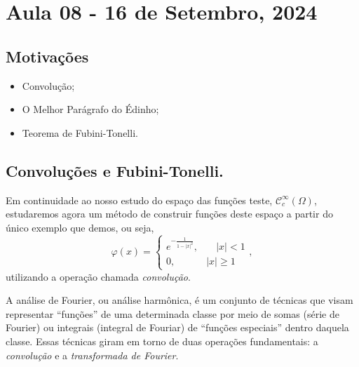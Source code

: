 \documentclass[../distribution_theory_notes.tex]{subfiles}
\begin{document}
\section{Aula 08 - 16 de Setembro, 2024}
\subsection{Motivações}
\begin{itemize}
	\item Convolução;
	\item O Melhor Parágrafo do Édinho;
	\item Teorema de Fubini-Tonelli.
\end{itemize}
\subsection{Convoluções e Fubini-Tonelli.}
Em continuidade ao nosso estudo do espaço das funções teste, \(\mathcal{C}_{c}^{\infty}(\Omega )\), estudaremos agora um método de construir funções deste espaço a partir do único exemplo que demos, ou seja,
\[
	\varphi (x) = \left\{\begin{array}{ll}
		e^{-\frac{1}{1-|x|^{2}}}, & \quad |x|<1 \\
		0,                        & |x|\geq 1
	\end{array}\right.,
\]
utilizando a operação chamada \textit{convolução}.
  \begin{tcolorbox}[
  skin=enhanced,
  title=Observação,
  fonttitle=\bfseries,
colframe=black,
  colbacktitle=cyan!75!white, 
  colback=cyan!15,
  colbacklower=black,
coltitle=black,
  drop fuzzy shadow,
  ]
  A análise de Fourier, ou análise harmônica, é um conjunto de técnicas que visam representar ``funções'' de uma determinada classe por meio de somas (série de Fourier) ou integrais (integral de Fouriar) de ``funções especiais'' dentro daquela classe. Essas técnicas giram em torno de duas operações fundamentais: a \textit{convolução} e a \textit{transformada de Fourier}.
  \end{tcolorbox}
\end{document}
